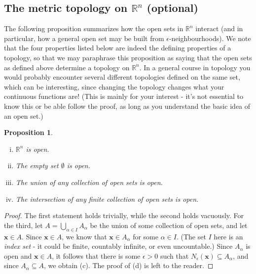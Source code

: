 \documentclass[12pt,letterpaper]{article}
\newtheorem{proposition}[theorem]{Proposition}
\newcommand{\R}{\mathbb{R}}
\newcommand{\x}{\mathbf{x}}
\begin{document}
\subsection{The metric topology on $\R^n$ (optional)}
The following proposition summarizes how the open sets in $\R^n$ interact (and in particular, how a general open set may be built from $\epsilon$-neighbourhoods).  We note that the four properties listed below are indeed the defining properties of a topology, so that we may paraphrase this proposition as saying that the open sets as defined above determine a topology on $\R^n$. In a general course in topology you would probably encounter several different topologies defined on the same set, which can be interesting, since changing the topology changes what your continuous functions are! (This is mainly for your interest - it's not essential to know this or be able follow the proof, as long as you understand the basic idea of an open set.)
\begin{proposition}\label{prop2}
\begin{enumerate}[(i)]
\item $\R^n$ is open.
\item The empty set $\emptyset$ is open.
\item The union of any collection of open sets is open.
\item The intersection of any finite collection of open sets is open.
\end{enumerate}
\end{proposition}
\begin{proof}
The first statement holds trivially, while the second holds vacuously.  For the third, let $A = \bigcup\limits_{\alpha\in I}A_\alpha$ be the union of some collection of open sets, and let $\x\in A$.  Since $\x\in A$, we know that $\x\in A_\alpha$ for some $\alpha\in I$. (The set $I$ here is an {\em index set} - it could be finite, countably infinite, or even uncountable.) Since $A_\alpha$ is open and $\x\in A$, it follows that there is some $\epsilon>0$ such that $N_\epsilon(\x)\subseteq A_\alpha$, and since $A_\alpha\subseteq A$, we obtain (c).  The proof of (d) is left to the reader.
\end{proof}
\end{document}
